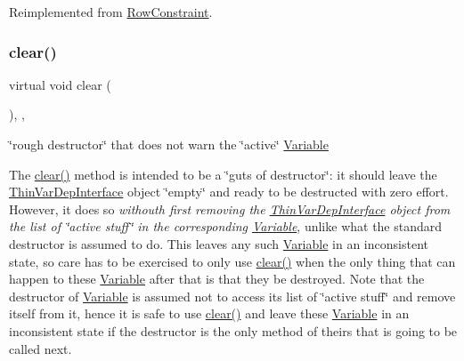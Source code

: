 Reimplemented from \mbox{\hyperlink{class_s_m_spp__di__unipi__it_1_1_row_constraint_a4207e8720a4543e4840b795a3d97b4e0}{Row\+Constraint}}.

\mbox{\label{class_s_m_spp__di__unipi__it_1_1_f_row_constraint_a9862fdd31593937c218bbda548c85fcc}} 
\subsubsection{\texorpdfstring{clear()}{clear()}}
{\footnotesize\ttfamily virtual void clear (\begin{DoxyParamCaption}\item[{void}]{ }\end{DoxyParamCaption})\hspace{0.3cm}{\ttfamily [inline]}, {\ttfamily [override]}, {\ttfamily [virtual]}}



\char`\"{}rough destructor\char`\"{} that does not warn the \char`\"{}active\char`\"{} \mbox{\hyperlink{class_s_m_spp__di__unipi__it_1_1_variable}{Variable}} 

The \mbox{\hyperlink{class_s_m_spp__di__unipi__it_1_1_f_row_constraint_a9862fdd31593937c218bbda548c85fcc}{clear()}} method is intended to be a \char`\"{}guts of destructor\char`\"{}\+: it should leave the \mbox{\hyperlink{class_s_m_spp__di__unipi__it_1_1_thin_var_dep_interface}{Thin\+Var\+Dep\+Interface}} object \char`\"{}empty\char`\"{} and ready to be destructed with zero effort. However, it does so {\itshape withouth first removing the \mbox{\hyperlink{class_s_m_spp__di__unipi__it_1_1_thin_var_dep_interface}{Thin\+Var\+Dep\+Interface}} object from the list of \char`\"{}active stuff\char`\"{} in the corresponding \mbox{\hyperlink{class_s_m_spp__di__unipi__it_1_1_variable}{Variable}}}, unlike what the standard destructor is assumed to do. This leaves any such \mbox{\hyperlink{class_s_m_spp__di__unipi__it_1_1_variable}{Variable}} in an inconsistent state, so care has to be exercised to only use \mbox{\hyperlink{class_s_m_spp__di__unipi__it_1_1_f_row_constraint_a9862fdd31593937c218bbda548c85fcc}{clear()}} when the only thing that can happen to these \mbox{\hyperlink{class_s_m_spp__di__unipi__it_1_1_variable}{Variable}} after that is that they be destroyed. Note that the destructor of \mbox{\hyperlink{class_s_m_spp__di__unipi__it_1_1_variable}{Variable}} is assumed not to access its list of \char`\"{}active
stuff\char`\"{} and remove itself from it, hence it is safe to use \mbox{\hyperlink{class_s_m_spp__di__unipi__it_1_1_f_row_constraint_a9862fdd31593937c218bbda548c85fcc}{clear()}} and leave these \mbox{\hyperlink{class_s_m_spp__di__unipi__it_1_1_variable}{Variable}} in an inconsistent state if the destructor is the only method of theirs that is going to be called next.

